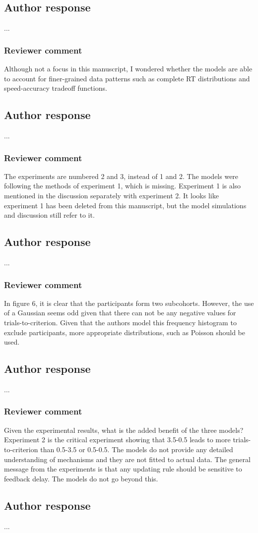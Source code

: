 \documentclass[12pt]{article}
\begin{document}
\subsection{Author response}
...

\subsubsection{Reviewer comment}
Although not a focus in this manuscript, I wondered whether
the models are able to account for finer-grained data
patterns such as complete RT distributions and
speed-accuracy tradeoff functions.

\subsection{Author response}
...

\subsubsection{Reviewer comment}
The experiments are numbered 2 and 3, instead of 1 and 2.
The models were following the methods of experiment 1, which
is missing. Experiment 1 is also mentioned in the discussion
separately with experiment 2. It looks like experiment 1 has
been deleted from this manuscript, but the model simulations
and discussion still refer to it.

\subsection{Author response}
...

\subsubsection{Reviewer comment}
In figure 6, it is clear that the participants form two
subcohorts. However, the use of a Gaussian seems odd given
that there can not be any negative values for
trials-to-criterion. Given that the authors model this
frequency histogram to exclude participants, more
appropriate distributions, such as Poisson should be used.

\subsection{Author response}
...

\subsubsection{Reviewer comment}
Given the experimental results, what is the added benefit of
the three models? Experiment 2 is the critical experiment
showing that 3.5-0.5 leads to more trials-to-criterion than
0.5-3.5 or 0.5-0.5. The models do not provide any detailed
understanding of mechanisms and they are not fitted to
actual data. The general message from the experiments is
that any updating rule should be sensitive to feedback
delay. The models do not go beyond this.

\subsection{Author response}
...
\end{document}
